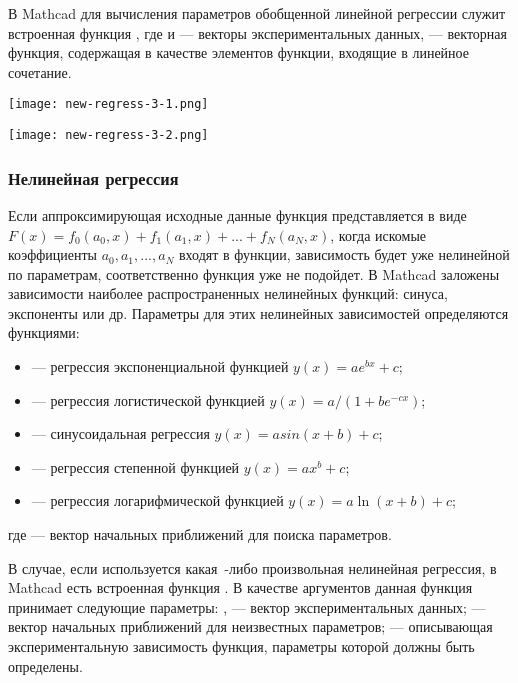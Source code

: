 В Mathcad для вычисления параметров обобщенной линейной регрессии служит встроенная функция , где  и  --- векторы экспериментальных данных,  --- векторная функция, содержащая в качестве элементов функции, входящие в линейное сочетание.


\begin{center}
	\texttt{[image: new-regress-3-1.png]}
\end{center}
\begin{center}
	\texttt{[image: new-regress-3-2.png]}
\end{center}


\subsubsection{Нелинейная регрессия}

Если аппроксимирующая исходные данные функция представляется в виде $F(x) = f_0 (a_0, x) + f_1(a_1,x) +... + f_N(a_N,x)$, когда искомые коэффициенты $a_0, a_1, ..., a_N$ входят в функции, зависимость будет уже нелинейной по параметрам, соответственно функция  уже не подойдет.
В Mathcad заложены зависимости наиболее распространенных нелинейных функций: синуса, экспоненты или др. Параметры для этих нелинейных зависимостей определяются функциями: 
\begin{itemize}
	\item {} --- регрессия  экспоненциальной функцией $y(x)=a e^{b x}+c$;
	\item {} --- регрессия логистической функцией $y(x)=a/(1+b e^{-c x})$;
	\item {} --- синусоидальная регрессия $y(x)=a sin(x+b)+c$;
	\item {} --- регрессия степенной функцией $y(x)=a x^b+c$;
	\item {} --- регрессия логарифмической функцией $y(x)=a\ln(x+b)+c$;
\end{itemize}
где  --- вектор начальных приближений для поиска параметров. 

В случае, если используется какая~-либо произвольная нелинейная регрессия,  в Mathcad есть встроенная функция . В качестве аргументов данная функция принимает следующие параметры: ,  --- вектор экспериментальных данных;  --- вектор начальных приближений для неизвестных параметров;
 --- описывающая экспериментальную зависимость функция, параметры которой должны быть определены.

